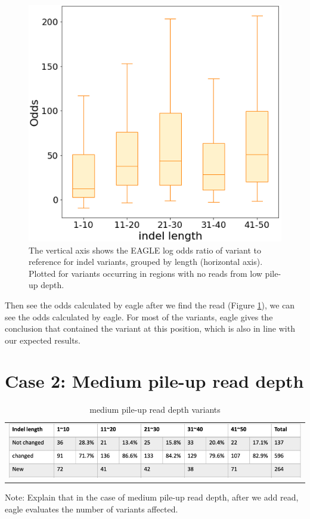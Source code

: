 \vspace{0.5cm}
\begin{figure}[H]
    \centering
    \includegraphics[width=0.6\columnwidth]{body/image/4-6.png}
    \captionsetup{labelfont=bf}
    \renewcommand{\baselinestretch}{1.0}
    \caption[no reads with variants from low pile-up depth odds ratio]{The vertical axis shows the EAGLE log odds ratio of variant to reference for indel variants, grouped by length (horizontal axis).  Plotted for variants occurring in regions with no reads from low pile-up depth.}
    \label{f4-6}
\end{figure}

Then see the odds calculated by eagle after we find the read (Figure \ref{f4-6}), we can see the odds calculated by eagle. For most of the variants, eagle gives the conclusion that contained the variant at this position, which is also in line with our expected results.


\section{Case 2: Medium pile-up read depth}
\begin{center}
\begin{table}[h]
    \centering
    \caption[medium pile-up read depth variants]{medium pile-up read depth variants}
    \vspace{-0.5cm}
    \begin{tabular}{c}
        \includegraphics[width=1\textwidth]{body/image/t4-4.png}
    \end{tabular}
    \label{t4-4}
    {Note: Explain that in the case of medium pile-up read depth, after we add read, eagle evaluates the number of variants affected.}
\end{table}
\end{center}

